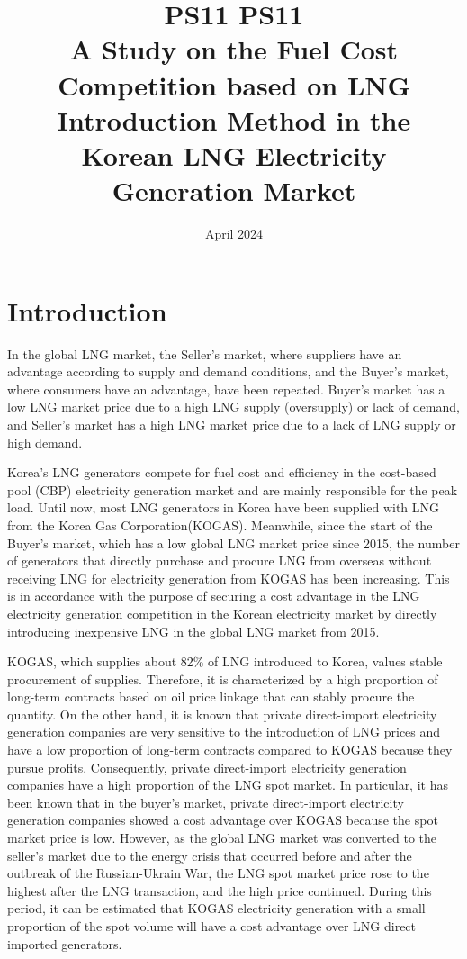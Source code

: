 \documentclass[leqno]{article}
\title{PS11}
\title{%
  PS11 \\
  \Large A Study on the Fuel Cost Competition based on LNG Introduction Method in the Korean LNG Electricity Generation Market}
\date{April 2024}
\begin{document}
\maketitle



\section{Introduction}

In the global LNG market, the Seller's market, where suppliers have an advantage according to supply and demand conditions, and the Buyer's market, where consumers have an advantage, have been repeated. Buyer's market has a low LNG market price due to a high LNG supply (oversupply) or lack of demand, and Seller's market has a high LNG market price due to a lack of LNG supply or high demand. 

Korea's LNG generators compete for fuel cost and efficiency in the cost-based pool (CBP) electricity generation market and are mainly responsible for the peak load. Until now, most LNG generators in Korea have been supplied with LNG from the Korea Gas Corporation(KOGAS). Meanwhile, since the start of the Buyer's market, which has a low global LNG market price since 2015, the number of generators that directly purchase and procure LNG from overseas without receiving LNG for electricity generation from KOGAS has been increasing. This is in accordance with the purpose of securing a cost advantage in the LNG electricity generation competition in the Korean electricity market by directly introducing inexpensive LNG in the global LNG market from 2015.

KOGAS, which supplies about 82\% of LNG introduced to Korea, values stable procurement of supplies. Therefore, it is characterized by a high proportion of long-term contracts based on oil price linkage that can stably procure the quantity. On the other hand, it is known that private direct-import electricity generation companies are very sensitive to the introduction of LNG prices and have a low proportion of long-term contracts compared to KOGAS because they pursue profits. Consequently, private direct-import electricity generation companies have a high proportion of the LNG spot market. In particular, it has been known that in the buyer's market, private direct-import electricity generation companies showed a cost advantage over KOGAS because the spot market price is low. However, as the global LNG market was converted to the seller's market due to the energy crisis that occurred before and after the outbreak of the Russian-Ukrain War, the LNG spot market price rose to the highest after the LNG transaction, and the high price continued. During this period, it can be estimated that  KOGAS electricity generation with a small proportion of the spot volume will have a cost advantage over LNG direct imported generators.
\end{document}
